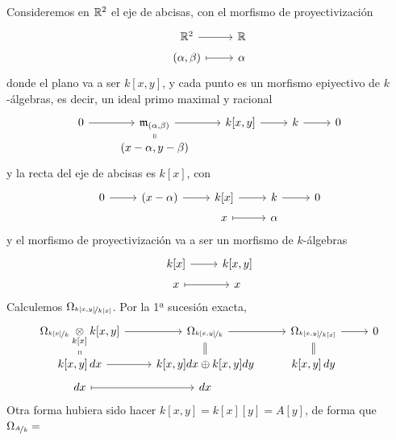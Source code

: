 \begin{ejem}
    Consideremos en $\mathbb{R}^2$ el eje de abcisas, con el morfismo de proyectivizaci\'on
    $$\bt \bb R^2\rar & \bb R \\[-5mm] (\alpha,\beta) \rarmaps & \alpha \et$$
    donde el plano va a ser $k[x,y]$, y cada punto es un morfismo epiyectivo de $k$-\'algebras, es decir, un ideal primo maximal y racional
    $$\bt 0\rar & \m_{(\alpha, \beta)} \rar & k[x,y] \rar & k \rar & 0 \\[-5mm] 
    & (x-\alpha, y-\beta) \arrow[equal]{u} &  &
    \et$$
    y la recta del eje de abcisas es $k[x]$, con 
    $$\bt 0\rar & (x-\alpha) \rar & k[x] \rar & k \rar & 0\\[-5mm] & &x\rarmaps & \alpha   \et$$
    y el morfismo de proyectivizaci\'on va a ser un morfismo de $k$-\'algebras
    $$\bt k[x] \rar & k[x,y] \\[-5mm] x\rarmaps & x \et$$
    Calculemos $\Omega_{\nicefrac{k[x,y]}{k[x]}}$. Por la 1ª sucesi\'on exacta, 
    $$\bt \Omega_{\nicefrac{k[x]}{k}} \underset{k[x]}{\otimes} k[x,y] \rar & \Omega_{\nicefrac{k[x,y]}{k}} \rar & \Omega_{\nicefrac{k[x,y]}{k[x]}} \rar & 0 \\[-5mm] k[x,y] \, dx \arrow[equal]{u} \rar & \arrow[equal]{u} k[x,y] dx \oplus k[x,y] dy & k[x,y] \, dy \arrow[equal]{u}  \\[-5mm] dx \rarmaps & dx \et$$
    Otra forma hubiera sido hacer $k[x,y]= k[x][y] = A[y]$, de forma que $\Omega_{\nicefrac{A}{k}} = $
\end{ejem}
